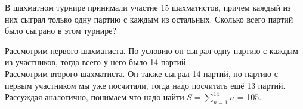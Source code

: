  В шахматном турнире принимали участие 15 шахматистов, причем каждый из них сыграл только одну партию с каждым из остальных. Сколько всего партий было сыграно в этом турнире?

\Solution Рассмотрим первого шахматиста. По условию он сыграл одну партию с каждым из участников, тогда всего у него было 14 партий.\\
Рассмотрим второго шахматиста. Он также сыграл 14 партий, но партию с первым участником мы уже посчитали, тогда надо посчитать ещё 13 партий.\\
Рассуждая аналогично, понимаем что надо найти $S=\sum\limits_{n=1}^{14}n$ = 105.\\
